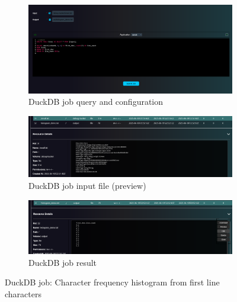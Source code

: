 \begin{figure}[!htbp]
    \centering
    \begin{subfigure}[b]{0.9\textwidth}
        \includegraphics[width=\textwidth]{Images/duckdb_histogram_demo.png}
        \caption{DuckDB job query and configuration}
        \label{fig:exampleduckdb.1}
    \end{subfigure}

    \vspace{1em}

    \begin{subfigure}[b]{0.9\textwidth}
        \includegraphics[width=\textwidth]{Images/duckdb_histogram_demo_input.png}
        \caption{DuckDB job input file (preview)}
        \label{fig:exampleduckdb.2}
    \end{subfigure}

    \vspace{1em}

    \begin{subfigure}[b]{0.9\textwidth}
        \includegraphics[width=\textwidth]{Images/duckdb_histogram_demo_output.png}
        \caption{DuckDB job result}
        \label{fig:exampleduckdb.3}
    \end{subfigure}
    \caption{DuckDB job: Character frequency histogram from first line characters}
\end{figure}
